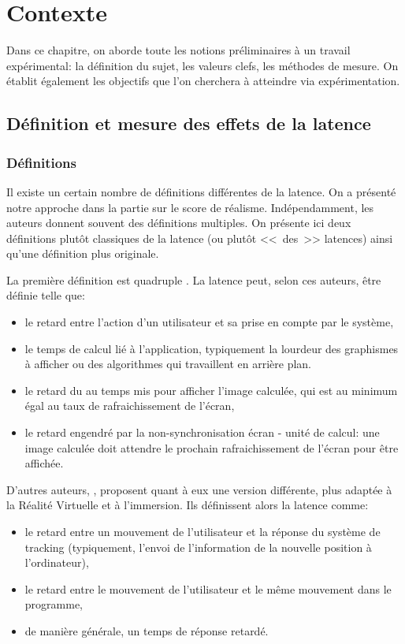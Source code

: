 \chapter{Contexte}
	\par Dans ce chapitre, on aborde toute les notions préliminaires à un travail expérimental: la définition du sujet, les valeurs clefs, les méthodes de mesure. On établit également les objectifs que l'on cherchera à atteindre via expérimentation.
	
	\section{Définition et mesure des effets de la latence}
	\subsection{Définitions}	
	\par Il existe un certain nombre de définitions différentes de la latence. On a présenté notre approche dans la partie sur le score de réalisme. Indépendamment, les auteurs donnent souvent des définitions multiples. On présente ici deux définitions plutôt classiques de la latence (ou plutôt <<~des~>> latences) ainsi qu'une définition plus originale.
	
	\par La première définition est quadruple \citep{papadakis_system_2011}. La latence peut, selon ces auteurs, être définie telle que:
	\begin{itemize}
		\item le retard entre l'action d'un utilisateur et sa prise en compte par le système,
		\item le temps de calcul lié à l'application, typiquement la lourdeur des graphismes à afficher ou des algorithmes qui travaillent en arrière plan.
		\item le retard du au temps mis pour afficher l'image calculée, qui est au minimum égal au taux de rafraichissement de l'écran,
		\item le retard engendré par la non-synchronisation écran - unité de calcul: une image calculée doit attendre le prochain rafraichissement de l'écran pour être affichée.
	\end{itemize}		
	
	\par D'autres auteurs, \citep{hale_handbook_2015}, proposent quant à eux une version différente, plus adaptée à la Réalité Virtuelle et à l'immersion. Ils définissent alors la latence comme:
	\begin{itemize}
		\item le retard entre un mouvement de l'utilisateur et la réponse du système de tracking (typiquement, l'envoi de l'information de la nouvelle position à l'ordinateur),
		\item le retard entre le mouvement de l'utilisateur et le même mouvement dans le programme,
		\item de manière générale, un temps de réponse retardé.
	\end{itemize}		
	
